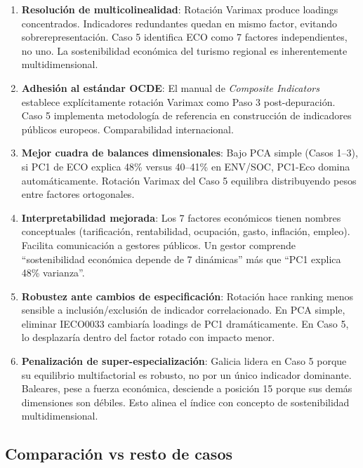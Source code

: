 \begin{enumerate}
    \item \textbf{Resolución de multicolinealidad}: Rotación Varimax produce loadings concentrados. Indicadores redundantes quedan en mismo factor, evitando sobrerepresentación. Caso 5 identifica ECO como 7 factores independientes, no uno. La sostenibilidad económica del turismo regional es inherentemente multidimensional.
    
    \item \textbf{Adhesión al estándar OCDE}: El manual de \emph{Composite Indicators} \citep{oecd2008handbook} establece explícitamente rotación Varimax como Paso 3 post-depuración. Caso 5 implementa metodología de referencia en construcción de indicadores públicos europeos. Comparabilidad internacional.
    
    \item \textbf{Mejor cuadra de balances dimensionales}: Bajo PCA simple (Casos 1--3), si PC1 de ECO explica 48\% versus 40--41\% en ENV/SOC, PC1-Eco domina automáticamente. Rotación Varimax del Caso 5 equilibra distribuyendo pesos entre factores ortogonales.
    
    \item \textbf{Interpretabilidad mejorada}: Los 7 factores económicos tienen nombres conceptuales (tarificación, rentabilidad, ocupación, gasto, inflación, empleo). Facilita comunicación a gestores públicos. Un gestor comprende ``sostenibilidad económica depende de 7 dinámicas'' más que ``PC1 explica 48\% varianza''.
    
    \item \textbf{Robustez ante cambios de especificación}: Rotación hace ranking menos sensible a inclusión/exclusión de indicador correlacionado. En PCA simple, eliminar IECO0033 cambiaría loadings de PC1 dramáticamente. En Caso 5, lo desplazaría dentro del factor rotado con impacto menor.
    
    \item \textbf{Penalización de super-especialización}: Galicia lidera en Caso 5 porque su equilibrio multifactorial es robusto, no por un único indicador dominante. Baleares, pese a fuerza económica, desciende a posición 15 porque sus demás dimensiones son débiles. Esto alinea el índice con concepto de sostenibilidad multidimensional.
\end{enumerate}

\subsection{Comparación vs resto de casos}

